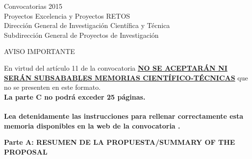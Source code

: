 \documentclass[a4paper,11pt,oneside]{article}
\begin{document}


\begin{tcolorbox}[colback=white,arc=0pt,outer arc=0pt,colframe=black,boxrule=0.6pt]
\begin{center}
Convocatorias 2015\\ 
Proyectos Excelencia y Proyectos RETOS \\ 
Dirección General de Investigación Científica y Técnica \\
Subdirección General de Proyectos de Investigación
\end{center} 
\end{tcolorbox}

\begin{tcolorbox}[colback=yellow,arc=0pt,outer arc=0pt,colframe=black,boxrule=0.6pt,left=0mm,right=0mm]
  \begin{center}
    AVISO IMPORTANTE\\
  \end{center}
    En virtud del art\'iculo 11 de la convocatoria \ul{\textbf{NO SE ACEPTAR\'AN NI SER\'AN SUBSABABLES MEMORIAS CIENT\'IFICO-T\'ECNICAS}} que no se presenten en este formato.
     \\
    \textbf{La parte C no podrá exceder 25 p\'aginas.}
    \\
    \\
    \textbf{Lea detenidamente las instrucciones para rellenar correctamente esta memoria disponibles en la web de la convocatoria .}
    \\
\end{tcolorbox}
\vspace{3pt}
\begin{tcolorbox}[colback=yellow,arc=0pt,outer arc=0pt,colframe=black,boxrule=0.6pt,left=0mm]
  \noindent\textbf{Parte A: RESUMEN DE LA PROPUESTA/SUMMARY OF THE PROPOSAL}
\end{tcolorbox}


\end{document}
